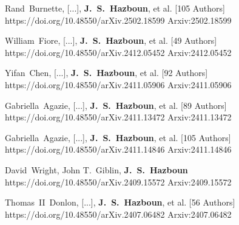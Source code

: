          {Rand~{Burnette}, [...], \textbf{J.~S.~{Hazboun}}, et al. [105 Authors]}
         {https://doi.org/10.48550/arXiv.2502.18599}
         {{Arxiv:}2502.18599}

         {William~{Fiore}, [...], \textbf{J.~S.~{Hazboun}}, et al. [49 Authors]}
         {https://doi.org/10.48550/arXiv.2412.05452}
         {{Arxiv:}2412.05452}

         {Yifan~{Chen}, [...], \textbf{J.~S.~{Hazboun}}, et al. [92 Authors]}
         {https://doi.org/10.48550/arXiv.2411.05906}
         {{Arxiv:}2411.05906}

         {Gabriella~{Agazie}, [...], \textbf{J.~S.~{Hazboun}}, et al. [89 Authors]}
         {https://doi.org/10.48550/arXiv.2411.13472}
         {{Arxiv:}2411.13472}

         {Gabriella~{Agazie}, [...], \textbf{J.~S.~{Hazboun}}, et al. [105 Authors]}
         {https://doi.org/10.48550/arXiv.2411.14846}
         {{Arxiv:}2411.14846}

         {David~{Wright}, John T.~{Giblin}, \textbf{J.~S.~Hazboun}}
         {https://doi.org/10.48550/arXiv.2409.15572}
         {{Arxiv:}2409.15572}

         {Thomas~II~{Donlon}, [...], \textbf{J.~S.~{Hazboun}}, et al. [56 Authors]}
         {https://doi.org/10.48550/arXiv.2407.06482}
         {{Arxiv:}2407.06482}

